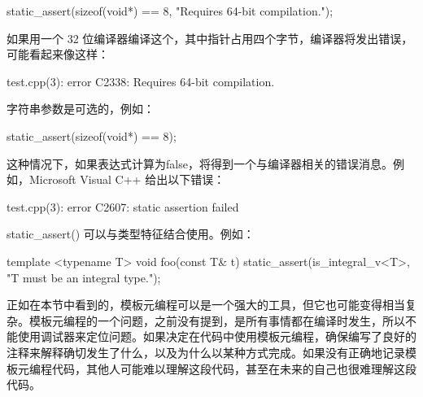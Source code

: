 \begin{cpp}
static_assert(sizeof(void*) == 8, "Requires 64-bit compilation.");
\end{cpp}

如果用一个 32 位编译器编译这个，其中指针占用四个字节，编译器将发出错误，可能看起来像这样：

\begin{shell}
test.cpp(3): error C2338: Requires 64-bit compilation.
\end{shell}

字符串参数是可选的，例如：

\begin{cpp}
static_assert(sizeof(void*) == 8);
\end{cpp}

这种情况下，如果表达式计算为false，将得到一个与编译器相关的错误消息。例如，Microsoft Visual C++ 给出以下错误：

\begin{shell}
test.cpp(3): error C2607: static assertion failed
\end{shell}

static\_assert() 可以与类型特征结合使用。例如：

\begin{cpp}
template <typename T>
void foo(const T& t)
{
    static_assert(is_integral_v<T>, "T must be an integral type.");
}
\end{cpp}


正如在本节中看到的，模板元编程可以是一个强大的工具，但它也可能变得相当复杂。模板元编程的一个问题，之前没有提到，是所有事情都在编译时发生，所以不能使用调试器来定位问题。如果决定在代码中使用模板元编程，确保编写了良好的注释来解释确切发生了什么，以及为什么以某种方式完成。如果没有正确地记录模板元编程代码，其他人可能难以理解这段代码，甚至在未来的自己也很难理解这段代码。






















